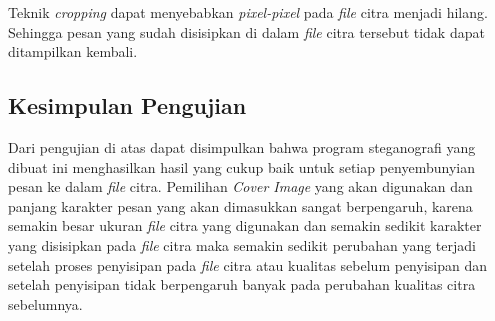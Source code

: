 	Teknik \emph{cropping} dapat menyebabkan \emph{pixel-pixel} pada \emph{file} citra menjadi hilang. Sehingga pesan yang sudah disisipkan di dalam \emph{file} citra tersebut tidak dapat ditampilkan kembali.
		 
	\subsection{Kesimpulan Pengujian}
	Dari pengujian di atas dapat disimpulkan bahwa program steganografi yang dibuat ini menghasilkan hasil yang cukup baik untuk setiap penyembunyian pesan ke dalam \emph{file} citra. Pemilihan \emph{Cover Image} yang akan digunakan dan panjang karakter pesan yang akan dimasukkan sangat berpengaruh, karena semakin besar ukuran \emph{file} citra yang digunakan dan semakin sedikit karakter yang disisipkan pada \emph{file} citra maka semakin sedikit perubahan yang terjadi setelah proses penyisipan pada \emph{file} citra atau kualitas sebelum penyisipan dan setelah penyisipan tidak berpengaruh banyak pada perubahan kualitas citra sebelumnya.
	